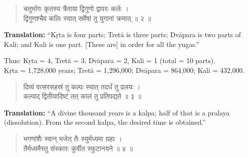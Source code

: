 \documentclass[11pt,a4paper]{article}
\newcommand{\dev}[1]{{\devanagarifont #1}}
\newenvironment{sanskritverse}{\begin{verse}\devanagarifont\large\centering}{\end{verse}}
\begin{document}
\vspace{0.5cm}

\begin{tcolorbox}[colback=white,colframe=rulecolor,title={\dev{\textbf{कालक्रिया २ — युगविभागः}}}]
\begin{sanskritverse}
\dev{चतुर्भागः कृतस्य त्रैताया द्विगुणो द्वापरः कलेः ।\\
द्विगुणश्चैव कलिः स्यात् सर्वेषां तु युगानां क्रमात् ॥ २ ॥}
\end{sanskritverse}
\end{tcolorbox}

\vspace{0.3cm}
\noindent\textbf{Translation:} ``Kṛta is four parts; Tretā is three parts; Dvāpara is two parts of Kali; and Kali is one part. [These are] in order for all the yugas.''

\smallskip
\noindent Thus: Kṛta = 4, Tretā = 3, Dvāpara = 2, Kali = 1 (total = 10 parts).\\
Kṛta = 1,728,000 years; Tretā = 1,296,000; Dvāpara = 864,000; Kali = 432,000.

\vspace{0.5cm}

\begin{tcolorbox}[colback=white,colframe=rulecolor,title={\dev{\textbf{कालक्रिया ३ — दिव्यवत्सराः}}}]
\begin{sanskritverse}
\dev{दिव्यं वत्सरसहस्रं तु कल्पः स्यात् तदर्धं तु प्रलयः ।\\
कल्पाद् द्वितीयादिष्टं तत् कालं तु प्रतिपद्यते ॥ ३ ॥}
\end{sanskritverse}
\end{tcolorbox}

\vspace{0.3cm}
\noindent\textbf{Translation:} ``A divine thousand years is a kalpa; half of that is a pralaya (dissolution). From the second kalpa, the desired time is obtained.''

\vspace{0.5cm}

\begin{tcolorbox}[colback=white,colframe=rulecolor,title={\dev{\textbf{कालक्रिया ४ — ग्रहमध्यमानम्}}}]
\begin{sanskritverse}
\dev{भगणांशैः स्वान् भजेत् तैः स्युर्मध्यमा ग्रहाः ।\\
तैर्मध्यमैस्तु संस्कारः कुर्वीत स्फुटानयने ॥ ४ ॥}
\end{sanskritverse}
\end{tcolorbox}
\end{document}
